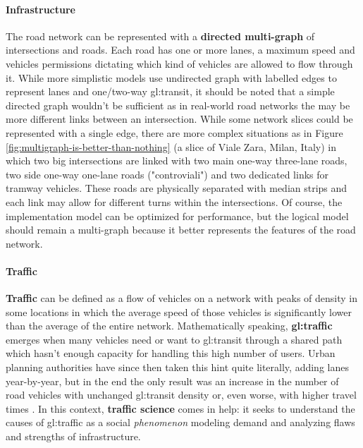 \paragraph{Infrastructure}

The road network can be represented with a \textbf{directed multi-graph} of intersections and roads. Each road has one or more lanes, a maximum speed and vehicles permissions dictating which kind of vehicles are allowed to flow through it. While more simplistic models use undirected graph with labelled edges to represent lanes and one/two-way \gls{gl:transit}, it should be noted that a simple directed graph wouldn't be sufficient as in real-world road networks the may be more different links between an intersection. While some network slices could be represented with a single edge, there are more complex situations as in Figure \ref{fig:multigraph-is-better-than-nothing} (a slice of Viale Zara, Milan, Italy) in which two big intersections are linked with two main one-way three-lane roads, two side one-way one-lane roads ("controviali") and two dedicated links for tramway vehicles. These roads are physically separated with median strips and each link may allow for different turns within the intersections. Of course, the implementation model can be optimized for performance, but the logical model should remain a multi-graph because it better represents the features of the road network.


\paragraph{Traffic}

\textbf{Traffic} can be defined as a flow of vehicles on a network with peaks of density in some locations in which the average speed of those vehicles is significantly lower than the average of the entire network.
Mathematically speaking, \textbf{\gls{gl:traffic}} emerges when many vehicles need or want to \gls{gl:transit} through a shared path which hasn't enough capacity for handling this high number of users.
Urban planning authorities have since then taken this hint quite literally, adding lanes year-by-year, but in the end the only result was an increase in the number of road vehicles with unchanged \gls{gl:transit} density or, even worse, with higher travel times \cite{Speck2018}.
In this context, \textbf{traffic science} comes in help: it seeks to understand the causes of \gls{gl:traffic} as a social \textit{phenomenon} modeling demand and analyzing flaws and strengths of infrastructure.

